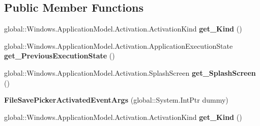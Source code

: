 \subsection*{Public Member Functions}
\begin{DoxyCompactItemize}
\item 
\mbox{\label{class_windows_1_1_application_model_1_1_activation_1_1_file_save_picker_activated_event_args_ae658916307d3ac97784cf5ebc417a45f}} 
global\+::\+Windows.\+Application\+Model.\+Activation.\+Activation\+Kind {\bfseries get\+\_\+\+Kind} ()
\item 
\mbox{\label{class_windows_1_1_application_model_1_1_activation_1_1_file_save_picker_activated_event_args_a8e3dd20c577382295b49b313910b5bab}} 
global\+::\+Windows.\+Application\+Model.\+Activation.\+Application\+Execution\+State {\bfseries get\+\_\+\+Previous\+Execution\+State} ()
\item 
\mbox{\label{class_windows_1_1_application_model_1_1_activation_1_1_file_save_picker_activated_event_args_a267e1f73d5ddd40ddfecc19ef78e13a0}} 
global\+::\+Windows.\+Application\+Model.\+Activation.\+Splash\+Screen {\bfseries get\+\_\+\+Splash\+Screen} ()
\item 
\mbox{\label{class_windows_1_1_application_model_1_1_activation_1_1_file_save_picker_activated_event_args_ae899934ca1652ab5d6dfd11011243dcf}} 
{\bfseries File\+Save\+Picker\+Activated\+Event\+Args} (global\+::\+System.\+Int\+Ptr dummy)
\item 
\mbox{\label{class_windows_1_1_application_model_1_1_activation_1_1_file_save_picker_activated_event_args_ae658916307d3ac97784cf5ebc417a45f}} 
global\+::\+Windows.\+Application\+Model.\+Activation.\+Activation\+Kind {\bfseries get\+\_\+\+Kind} ()
\item 
\mbox{\label{class_windows_1_1_application_model_1_1_activation_1_1_file_save_picker_activated_event_args_a8e3dd20c577382295b49b313910b5bab}} 

\end{DoxyCompactItemize}
